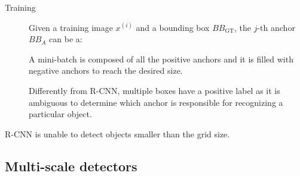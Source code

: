 \begin{description}
\begin{description}
            \begin{description}
                \item[Training]
                    Given a training image $x^{(i)}$ and a bounding box $BB_\text{GT}$, the $j$-th anchor $BB_A$ can be a:

                    A mini-batch is composed of all the positive anchors and it is filled with negative anchors to reach the desired size.

                    \begin{remark}
                        Differently from R-CNN, multiple boxes have a positive label as it is ambiguous to determine which anchor is responsible for recognizing a particular object.
                    \end{remark}
            \end{description}
        \end{description}
\end{description} 

\begin{remark}
    R-CNN is unable to detect objects smaller than the grid size.
\end{remark}


\subsection{Multi-scale detectors} \label{sec:multiscale_detector}

